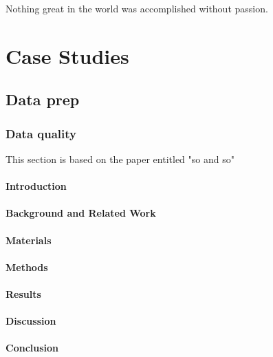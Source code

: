 \begin{savequote}[75mm]
Nothing great in the world was accomplished 
without passion.
\end{savequote}

\chapter{Case Studies}\label{chap:usecase}

\section{Data prep} \label{sec:dataprep}
\subsection{Data quality}\label{subsec:dq}
This section is based on the paper entitled "so and so"
%
\subsubsection{Introduction}

\subsubsection{Background and Related Work}

\subsubsection{Materials}

\subsubsection{Methods}

\subsubsection{Results}

\subsubsection{Discussion}

\subsubsection{Conclusion}



